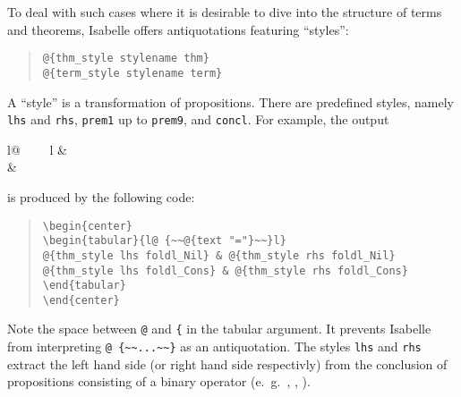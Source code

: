 \begin{isabellebody}
\begin{isamarkuptext}
  To deal with such cases where it is desirable to dive into the structure
  of terms and theorems, Isabelle offers antiquotations featuring
  ``styles'':

    \begin{quote}
    \verb!@!\verb!{thm_style stylename thm}!\\
    \verb!@!\verb!{term_style stylename term}!
    \end{quote}

  A ``style'' is a transformation of propositions. There are predefined
  styles, namely \verb!lhs! and \verb!rhs!, \verb!prem1! up to \verb!prem9!, and \verb!concl!.
  For example, 
  the output
  \begin{center}
  \begin{tabular}{l@ {~~\isa{{\isacharequal}}~~}l}
   & \\
   & 
  \end{tabular}
  \end{center}
  is produced by the following code:
  \begin{quote}
    \verb!\begin{center}!\\
    \verb!\begin{tabular}{l@ {~~!\verb!@!\verb!{text "="}~~}l}!\\
    \verb!@!\verb!{thm_style lhs foldl_Nil} & @!\verb!{thm_style rhs foldl_Nil}!\\
    \verb!@!\verb!{thm_style lhs foldl_Cons} & @!\verb!{thm_style rhs foldl_Cons}!\\
    \verb!\end{tabular}!\\
    \verb!\end{center}!
  \end{quote}
  Note the space between \verb!@! and \verb!{! in the tabular argument.
  It prevents Isabelle from interpreting \verb!@ {~~...~~}! 
  as an antiquotation. The styles \verb!lhs! and \verb!rhs!
  extract the left hand side (or right hand side respectivly) from the
  conclusion of propositions consisting of a binary operator
  (e.~g.~\isa{{\isacharequal}}, \isa{{\isasymequiv}}, \isa{{\isacharless}}).


\end{isamarkuptext}
\end{isabellebody}
